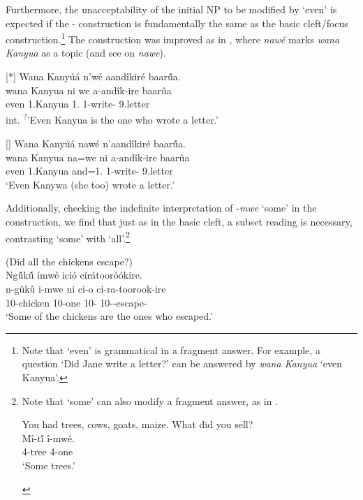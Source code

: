 \documentclass[output=paper]{langscibook}
\begin{document}
Furthermore, the unacceptability of the initial NP to be modified by ‘even’ is expected if the \NI-\PRO{} construction is fundamentally the same as the basic cleft/focus construction.\footnote{Note that ‘even’ is grammatical in a fragment answer. For example, a question ‘Did Jane write a letter?’ can be answered by \textit{wana Kanyua} ‘even Kanyua’.} The construction was improved as in , where \textit{nawé} marks \textit{wana Kanyua} as a topic (and see  on \textit{nawe}).

\ea
\label{bkm:Ref111987054}
\ea
[*]{
\label{bkm:Ref111987054:a}
Wana Kanyúá n’wé aandîkiré baar\'{û}a.\\
\gll
wana  Kanyua  ni  we  a-andîk-ire  baarûa\\
even  1.Kanyua \FOC{}  1.\PRO{} 1\SM{}-write-\PFV{} 9.letter\\
\glt
int. \textsuperscript{?}’Even Kanyua is the one who wrote a letter.’
}

\ex
[]{
\label{bkm:Ref111987054:b}
Wana Kanyúá nawé n’aandîkiré baar\'{û}a.\\
\gll
wana  Kanyua  na=we  ni  a-andîk-ire  baarûa\\
even  1.Kanyua  and=1.\PRO{} \FOC{}  1\SM{}-write-\PFV{} 9.letter\\
\glt
‘Even Kanywa (she too) wrote a letter.’
} 

\z
\z


Additionally, checking the indefinite interpretation of \mbox{-\textit{mwe}} ‘some’ in the construction, we find that just as in the basic cleft, a subset reading is necessary, contrasting `some' with `all'.\footnote{Note that ‘some’ can also modify a fragment answer, as in .

\ea
\label{ex:treescows}
\begin{xlist}
 You had trees, cows, goats, maize. What did you sell?\\
\gll
Mî-t\'{î} î-mwé.\\
4-tree  4-one\\
\glt
‘Some trees.’

\end{xlist}
\zlast
}

\ea
(Did all the chickens escape?)\\
Ng\'{û}k\'{û} ímwé ició círátooróókire.\\
\gll
n-gûkû  i-mwe  ni  ci-o  ci-ra-toorook-ire\\
10-chicken  10-one \FOC{}  10-\PRO{} 10\SM-\YPST{}-escape-\PFV{}\\
\glt
‘Some of the chickens are the ones who escaped.’
\end{document}
